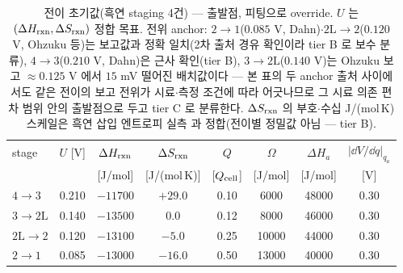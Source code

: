 \begin{table}[t]
\centering\footnotesize
\renewcommand{\arraystretch}{1.3}
\caption{전이 초기값(흑연 staging 4건) --- 출발점, 피팅으로 override. $U$ 는 $(\Delta H_{\mathrm{rxn}},\Delta S_{\mathrm{rxn}})$
정합 목표. 전위 anchor: $2\!\to\!1$($0.085$ V, Dahn\cite{dahn1991})$\cdot$$2\mathrm
L\!\to\!2$($0.120$ V, Ohzuku 등\cite{ohzuku1993})는 보고값과 정확 일치(2차 출처 경유 확인이라 tier B 로
보수 분류), $4\!\to\!3$($0.210$ V, Dahn\cite{dahn1991})은 근사 확인(tier B),
$3\!\to\!2\mathrm L$($0.140$ V)는 Ohzuku 보고 $\approx0.125$ V\cite{ohzuku1993} 에서 $15$ mV 떨어진
배치값이다 --- 본 표의 두 anchor 출처\cite{dahn1991,ohzuku1993} 사이에서도 같은 전이의 보고 전위가
시료$\cdot$측정 조건에 따라 어긋나므로 그 시료 의존 편차 범위 안의 출발점으로 두고 tier C 로 분류한다. $\Delta S_{\mathrm{rxn}}$ 의 부호$\cdot$수십
J/(mol\,K) 스케일은 흑연 삽입 엔트로피 실측\cite{reynier2003} 과 정합(전이별 정밀값 아님 --- tier B).}
\label{tab:staging}
\begin{tabular}{l c c c c c c c}
\toprule
stage & $U$ [V] & $\Delta H_{\mathrm{rxn}}$ & $\Delta S_{\mathrm{rxn}}$ & $Q$ & $\Omega$ & $\Delta H_a$ & $|\dd V/\dd q|_{q_a}$ \\
 &  & [J/mol] & [J/(mol\,K)] & [$Q_{\mathrm{cell}}$] & [J/mol] & [J/mol] & [V] \\
\midrule
$4\!\to\!3$   & 0.210 & $-11700$ & $+29.0$ & 0.10 & 6000  & 48000 & 0.30 \\
$3\!\to\!2\mathrm L$ & 0.140 & $-13500$ & $0.0$   & 0.12 & 8000  & 46000 & 0.30 \\
$2\mathrm L\!\to\!2$ & 0.120 & $-13100$ & $-5.0$  & 0.25 & 10000 & 44000 & 0.30 \\
$2\!\to\!1$   & 0.085 & $-13000$ & $-16.0$ & 0.50 & 13000 & 40000 & 0.30 \\
\bottomrule
\end{tabular}
\end{table}


